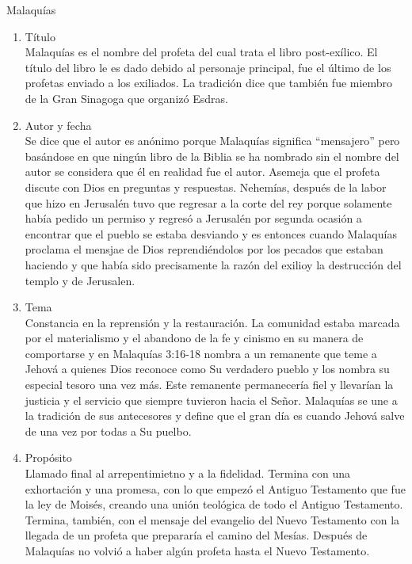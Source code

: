 %
%
\begin{section}{Malaquías}
	\begin{enumerate}
		\item Título\\
			Malaquías es el nombre del profeta del cual trata el libro post-exílico. El título del libro le es dado debido al personaje principal, fue el último de los profetas enviado a los exiliados. La tradición dice que también fue miembro de la Gran Sinagoga que organizó Esdras.
		\item Autor y fecha\\
			Se dice que el autor es anónimo porque Malaquías significa ``mensajero'' pero basándose en que ningún libro de la Biblia se ha nombrado sin el nombre del autor se considera que él en realidad fue el autor. Asemeja que el profeta discute con Dios en preguntas y respuestas. Nehemías, después de la labor que hizo en Jerusalén tuvo que regresar a la corte del rey porque solamente había pedido un permiso y regresó a Jerusalén por segunda ocasión a encontrar que el pueblo se estaba desviando y es entonces cuando Malaquías proclama el mensjae de Dios reprendiéndolos por los pecados que estaban haciendo y que había sido precisamente la razón del exilioy la destrucción del templo y de Jerusalen.
		\item Tema\\
			Constancia en la reprensión y la restauración. La comunidad estaba marcada por el materialismo y el abandono de la fe y cinismo en su manera de comportarse y en Malaquías 3:16-18 nombra a un remanente que teme a Jehová a quienes Dios reconoce como Su verdadero pueblo y los nombra su especial tesoro una vez más. Este remanente permanecería fiel y llevarían la justicia y el servicio que siempre tuvieron hacia el Señor. Malaquías se une a la tradición de sus antecesores y define que el gran día es cuando Jehová salve de una vez por todas a Su puelbo.
		\item Propósito\\
			Llamado final al arrepentimietno y a la fidelidad. Termina con una exhortación y una promesa, con lo que empezó el Antiguo Testamento que fue la ley de Moisés, creando una unión teológica de todo el Antiguo Testamento. Termina, también, con el mensaje del evangelio del Nuevo Testamento con la llegada de un profeta que prepararía el camino del Mesías. Después de Malaquías no volvió a haber algún profeta hasta el Nuevo Testamento.\\

\end{enumerate}
\end{section}
